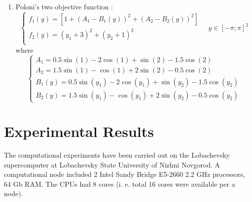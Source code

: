 \documentclass{llncs}
\begin{document}
\begin{enumerate}
\begin{equation}
\begin{array}{l}
      \end{array}
      \right .
      \quad y\in [-5;10]
    \end{equation}
  \item Poloni's two objective function \cite{Huband2006}:
    \begin{equation}
      \left \{
      \begin{array}{l}
        f_{1}\left(y\right) = \left[1 + \left(A_{1} - B_{1}\left(y\right) \right)^{2} + \left(A_{2} - B_{2}\left(y\right) \right)^{2} \right] \\
        f_{2}\left(y\right) = \left(y_1 + 3\right)^{2} + \left(y_2 + 1 \right)^{2} \\
      \end{array}
      \right .
      \quad y\in [-\pi;\pi]^2
    \end{equation}
    where
    \begin{equation*}
      \begin{cases}
        A_{1} = 0.5 \sin \left(1\right) - 2 \cos \left(1\right) + \sin \left(2\right) - 1.5 \cos \left(2\right)  \\
        A_{2} = 1.5 \sin \left(1\right) - \cos \left(1\right) + 2 \sin \left(2\right) - 0.5 \cos \left(2\right)  \\
        B_{1}\left(y\right) = 0.5 \sin \left(y_1\right) - 2 \cos \left(y_1\right) + \sin \left(y_2\right) - 1.5 \cos \left(y_2\right)  \\
        B_{2}\left(y\right) = 1.5 \sin \left(y_1\right) - \cos \left(y_1\right) + 2 \sin \left(y_2\right) - 0.5 \cos \left(y_2\right)
      \end{cases}
    \end{equation*}
\end{enumerate}
\section{Experimental Results}
The computational experiments have been carried out on the Lobachevsky supercomputer at
Lobachevsky State University of Nizhni Novgorod. A computational node included 2 Intel Sandy
Bridge E5-2660 2.2 GHz processors, 64 Gb RAM. The CPUs had 8 cores (i. e. total 16 cores
were available per a node).
\end{document}
